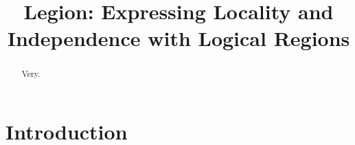 \documentclass[9pt,nocopyrightspace]{sigplanconf}
\begin{document}
\title{Legion: Expressing Locality and Independence with Logical Regions}
\authorinfo{}{}{}
\maketitle

\begin{abstract}
Very.
\end{abstract}

\section{Introduction}
\label{sect:intro}















{
\small

}
\end{document}
